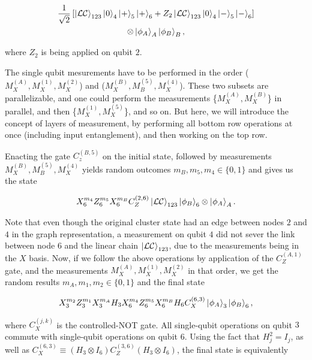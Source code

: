 \documentclass[twocolumn]{Styles/IEEEtran11}
\begin{document}
\begin{gather*}
  \frac{1}{\sqrt{2}}\left[\left|\mspace{0.5mu} \mathcal{LC} \mspace{0.5mu}\right\rangle_{123}\left|\mspace{0.5mu} 0 \mspace{0.5mu}\right\rangle_4\left|\mspace{0.5mu} + \mspace{0.5mu}\right\rangle_5\left|\mspace{0.5mu} + \mspace{0.5mu}\right\rangle_6+Z_{2}\left|\mspace{0.5mu} \mathcal{LC} \mspace{0.5mu}\right\rangle_{123}\left|\mspace{0.5mu} 0 \mspace{0.5mu}\right\rangle_4\left|\mspace{0.5mu} - \mspace{0.5mu}\right\rangle_5\left|\mspace{0.5mu} - \mspace{0.5mu}\right\rangle_6\right]\\\otimes\left|\mspace{0.5mu} \phi_A \mspace{0.5mu}\right\rangle_A\left|\mspace{0.5mu} \phi_B \mspace{0.5mu}\right\rangle_B,
\end{gather*}

\noindent where $Z_{2}$ is being applied on qubit $2$.

The single qubit mesurements have to be performed in the order ($M^{(A)}_X, M^{(1)}_X, M^{(2)}_X$) and ($M^{(B)}_X, M^{(5)}_B, M^{(4)}_X$). These two subsets are parallelizable, and one could perform the measurements \{$M^{(A)}_X, M^{(B)}_X$\} in parallel, and then \{$M^{(1)}_X, M^{(5)}_X$\}, and so on. But here, we will introduce the concept of layers of measurement, by performing all bottom row operations at once (including input entanglement), and then working on the top row.

Enacting the gate $C_z^{(B,5)}$ on the initial state, followed by measurements $M^{(B)}_X, M^{(5)}_B, M^{(4)}_X$ yields random outcomes $m_B, m_5, m_4 \in \{0,1\}$ and  gives us the state

\begin{gather*}
  X_6^{m_4}Z_6^{m_5}X_6^{m_B}C_Z^{(2,6)}\left|\mspace{0.5mu} \mathcal{LC} \mspace{0.5mu}\right\rangle_{123}\left|\mspace{0.5mu} \phi_B \mspace{0.5mu}\right\rangle_6\otimes\left|\mspace{0.5mu} \phi_A \mspace{0.5mu}\right\rangle_A.
\end{gather*}

Note that even though the original cluster state had an edge between nodes $2$ and $4$ in the graph representation, a measurement on qubit $4$ did not sever the link between node $6$ and the linear chain $\left|\mspace{0.5mu} \mathcal{LC} \mspace{0.5mu}\right\rangle_{123}$, due to the measurements being in the $X$ basis. Now, if we follow the above operations by application of the $C_Z^{(A,1)}$ gate, and the measurements $M^{(A)}_X, M^{(1)}_X, M^{(2)}_X$ in that order, we get the random results $m_A, m_1, m_2 \in \{0,1\}$ and the final state

\begin{gather*}
  X_3^{m_2}Z_3^{m_1}X_3^{m_A}H_3X_6^{m_4}Z_6^{m_5}X_6^{m_B}H_6C_X^{(6,3)}\left|\mspace{0.5mu} \phi_A \mspace{0.5mu}\right\rangle_3\left|\mspace{0.5mu} \phi_B \mspace{0.5mu}\right\rangle_6,
\end{gather*}

\noindent where $C_X^{(j,k)}$ is the controlled-NOT gate. All single-qubit operations on qubit $3$ commute with single-qubit operations on qubit $6$. Using the fact that $H_j^2 = I_j$, as well as $C_X^{(6,3)}\equiv (H_3\otimes I_6)C_Z^{(3,6)}(H_3\otimes I_6)$, the final state is equivalently
\end{document}
